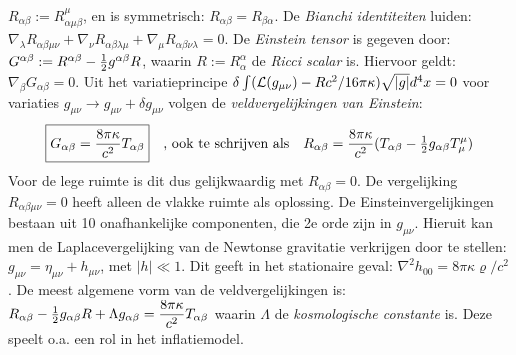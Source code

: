 $R_{\alpha\beta}:=R^\mu_{\alpha\mu\beta}$, en is symmetrisch:\linebreak
$R_{\alpha\beta}=R_{\beta\alpha}$. De {\it Bianchi identiteiten} luiden:
$\nabla_\lambda R_{\alpha\beta\mu\nu}+\nabla_\nu R_{\alpha\beta\lambda\mu}+
\nabla_\mu R_{\alpha\beta\nu\lambda}=0$.
\npar
De {\it Einstein tensor} is gegeven door:
$G^{\alpha\beta}:=R^{\alpha\beta}-\mbox{$\frac{1}{2}$} g^{\alpha\beta}R$, waarin
$R:=R_\alpha^\alpha$ de {\it Ricci scalar} is. Hiervoor geldt:
$\nabla_\beta G_{\alpha\beta}=0$. Uit het variatieprincipe
$\delta\int({\cal L}(g_{\mu\nu})-Rc^2/16\pi\kappa)\sqrt{|g|}d^4x=0$ voor variaties
$g_{\mu\nu}\rightarrow g_{\mu\nu}+\delta g_{\mu\nu}$ volgen de
{\it veldvergelijkingen van Einstein}:
\[
\mbox{\fbox{$\displaystyle
G_{\alpha\beta}=\frac{8\pi\kappa}{c^2}T_{\alpha\beta}
$}}
~~~\mbox{, ook te schrijven als}~~~
R_{\alpha\beta}=\frac{8\pi\kappa}{c^2}(T_{\alpha\beta}-\mbox{$\frac{1}{2}$} g_{\alpha\beta}T^{\mu}_{\mu})
\]
Voor de lege ruimte is dit dus gelijkwaardig met $R_{\alpha\beta}=0$. De
vergelijking $R_{\alpha\beta\mu\nu}=0$ heeft alleen de vlakke ruimte als
oplossing.
\npar
De Einsteinvergelijkingen bestaan uit 10 onafhankelijke componenten, die 2e
orde zijn in $g_{\mu\nu}$. Hieruit kan men de Laplacevergelijking van de
Newtonse gravitatie verkrijgen door te stellen:
$g_{\mu\nu}=\eta_{\mu\nu}+h_{\mu\nu}$, met $|h|\ll1$. Dit geeft in het
stationaire geval: $\nabla^2 h_{00}=8\pi\kappa\varrho/c^2$.
\npar
De meest algemene vorm van de veldvergelijkingen is:
$\displaystyle R_{\alpha\beta}-\mbox{$\frac{1}{2}$} g_{\alpha\beta}R+\Lambda g_{\alpha\beta}=\frac{8\pi\kappa}{c^2}T_{\alpha\beta}$
\npar
waarin $\Lambda$ de {\it kosmologische constante} is. Deze speelt o.a. een
rol in het inflatiemodel.

